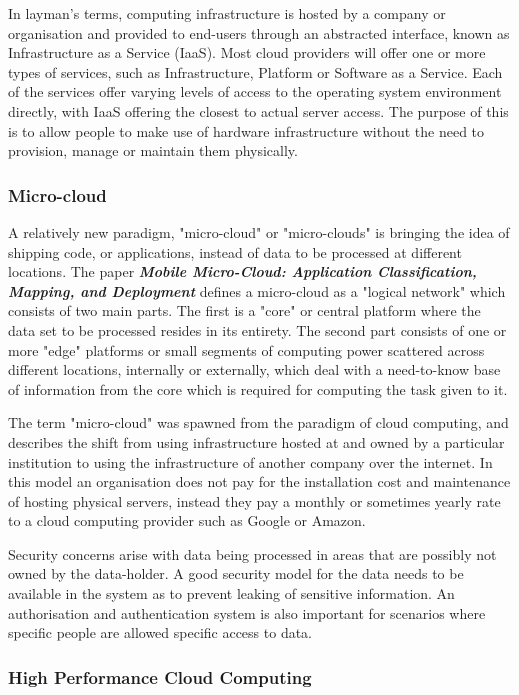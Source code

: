 In layman's terms, computing infrastructure is hosted by a company or organisation and provided to end-users through an abstracted interface, known as Infrastructure as a Service (IaaS). Most cloud providers will offer one or more types of services, such as Infrastructure, Platform or Software as a Service. Each of the services offer varying levels of access to the operating system environment directly, with IaaS offering the closest to actual server access. The purpose of this is to allow people to make use of hardware infrastructure without the need to provision, manage or maintain them physically.

\subsubsection{Micro-cloud}

A relatively new paradigm, "micro-cloud" or "micro-clouds" is bringing the idea of shipping code, or applications, instead of data to be processed at different locations. The paper \textbf{\textit{Mobile Micro-Cloud: Application Classification, Mapping, and Deployment}} \parencite{wang2013mobile} defines a micro-cloud as a "logical network" which consists of two main parts. The first is a "core" or central platform where the data set to be processed resides in its entirety. The second part consists of one or more "edge" platforms or small segments of computing power scattered across different locations, internally or externally, which deal with a need-to-know base of information from the core which is required for computing the task given to it.

The term "micro-cloud" was spawned from the paradigm of cloud computing, and describes the shift from using infrastructure hosted at and owned by a particular institution to using the infrastructure of another company over the internet. In this model an organisation does not pay for the installation cost and maintenance of hosting physical servers, instead they pay a monthly or sometimes yearly rate to a cloud computing provider such as Google or Amazon.

Security concerns arise with data being processed in areas that are possibly not owned by the data-holder. A good security model for the data needs to be available in the system as to prevent leaking of sensitive information. An authorisation and authentication system is also important for scenarios where specific people are allowed specific access to data. 

\subsubsection{High Performance Cloud Computing}

